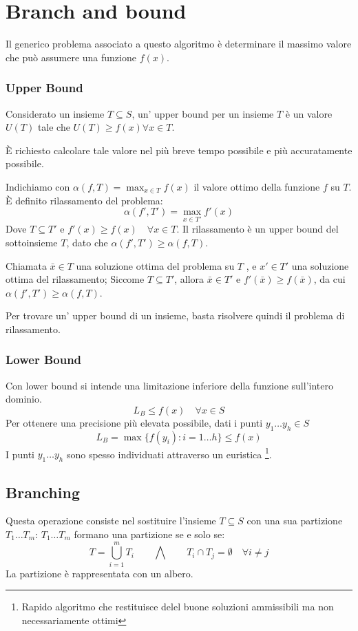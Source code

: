 \documentclass[../template]{subfiles}
\begin{document}
\section{Branch and bound}
Il generico problema associato a questo algoritmo è determinare il massimo valore che può assumere una funzione $f(x)$.
\subsubsection{Upper Bound}
Considerato un insieme $T \subseteq S$, un' upper bound per un insieme $T$ è un valore $U(T)$ tale che $U(T) \ge f(x) \forall x \in
T$.

È richiesto calcolare tale valore nel più breve tempo possibile e più accuratamente possibile.

Indichiamo con $\alpha(f, T) = \max_{x\in T} f(x)$ il valore ottimo della funzione $f$ su $T$.
È definito rilassamento del problema:
\[
    \alpha(f', T') = \max_{x \in T'} f'(x)
\]
Dove $T \subseteq T'$ e $f'(x) \ge f(x) \quad \forall x \in T$. Il rilassamento è un upper bound del sottoinsieme $T$,
dato che $\alpha(f', T') \ge \alpha(f, T)$.

Chiamata $\bar{x}\in T$ una soluzione ottima del problema su $T$ , e $x' \in T'$ una soluzione ottima del rilassamento;
Siccome $T \subseteq T'$, allora $\bar{x} \in T'$ e $f'(\bar{x}) \ge f(\bar{x})$, da cui $\alpha(f', T') \ge \alpha(f,
T)$.

Per trovare un' upper bound di un insieme, basta risolvere quindi il problema di rilassamento.
\subsubsection{Lower Bound}
Con lower bound si intende una limitazione inferiore della funzione sull'intero dominio.
\[
    L_B \le f(x) \quad \forall x \in S
\]
Per ottenere una precisione più elevata possibile, dati i punti $y_1\dots y_h \in S$
\[
    L_B = \max \big\{f(y_i) : i=1\dots h\big\} \le f(x)
\]
I punti $y_1\dots y_h$ sono spesso individuati attraverso un euristica \footnote{Rapido algoritmo che restituisce delel
buone soluzioni ammissibili ma non necessariamente ottimi}.
\subsection{Branching}
Questa operazione consiste nel sostituire l'insieme $T \subseteq S$ con una sua partizione $T_1 \dots T_m$:
$T_1\dots T_m$ formano una partizione se e solo se:
\[
    T = \bigcup^m_{i=1}T_i \qquad \bigwedge \qquad T_i \cap T_j = \emptyset \quad \forall i \neq j
\]
La partizione è rappresentata con un albero.
\end{document}
